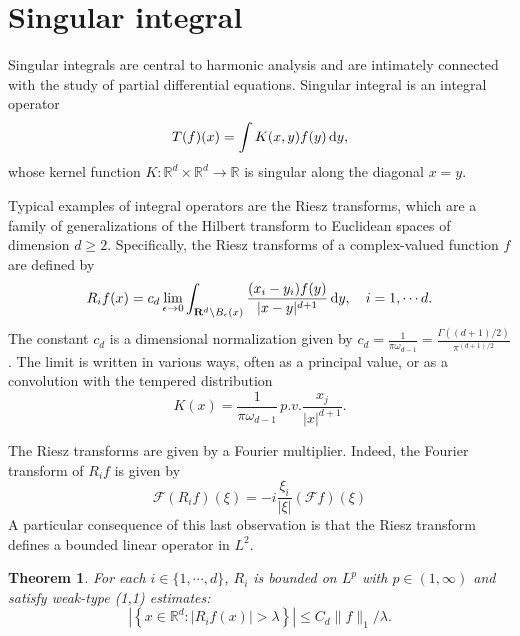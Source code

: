 \documentclass[twoside, 12pt]{book}
\numberwithin{equation}{chapter}
\newtheorem{theorem}{Theorem}[section]
\def\mR{{\mathbb R}}
\def\l{\left}
\def\r{\right}
\def\geq{\geqslant}
\def\leq{\leqslant}
\def\d{\text{\rm{d}}}
\begin{document}
	\section{Singular integral}
	Singular integrals are central to harmonic analysis and are intimately connected with the study of partial differential equations. Singular integral is an integral operator
	\[
	    T(f)(x)=\int K(x,y)f(y)\,\d y,
	\]
	whose kernel function $K: \mR^d\times\mR^d\to \mR$ is singular along the diagonal $x=y$. 
	
	Typical examples of integral operators are the Riesz transforms, which are a family of generalizations of the Hilbert transform to Euclidean spaces of dimension $d\geq 2$. Specifically, the Riesz transforms of a complex-valued function $f$ are defined by 
	\[
	    R_{i}f(x)=c_{d}\lim _{\epsilon \to 0}\int _{\mathbf {R}^{d}\backslash B_{\epsilon }(x)}{\frac {(x_{i}-y_{i})f(y)}{|x-y|^{d+1}}}\,\d y, \quad i=1,\cdots d. 
	\]
	The constant $c_d$ is a dimensional normalization given by $c_d={\frac {1}{\pi \omega _{d-1}}}=\frac {\Gamma((d+1)/2)}{\pi ^{(d+1)/2}}$. 
	The limit is written in various ways, often as a principal value, or as a convolution with the tempered distribution
	\[
	    K(x)={\frac {1}{\pi \omega _{d-1}}}\,p.v.{\frac {x_{j}}{|x|^{d+1}}}.
	\]
	
	The Riesz transforms are given by a Fourier multiplier. Indeed, the Fourier transform of $R_i f$ is given by 
	\[
	    \mathcal{F} (R_{i}f)(\xi)=-i \frac{\xi_{i}}{|\xi|} (\mathcal{F} f)(\xi)
	\] 
	A particular consequence of this last observation is that the Riesz transform defines a bounded linear operator in $L^2$.
	
	\begin{theorem}
	For each $i\in \{1,\cdots, d\}$, $R_i$ is bounded on $L^p$ with $p\in (1,\infty)$ and satisfy weak-type (1,1) estimates: 
		\begin{equation}
			\l| \l\{x\in \mR^d:  |R_i f(x)|>\lambda \r\}\r|\leq C_d \|f\|_1/\lambda. 
		\end{equation}\end{theorem}
	
\end{document}
